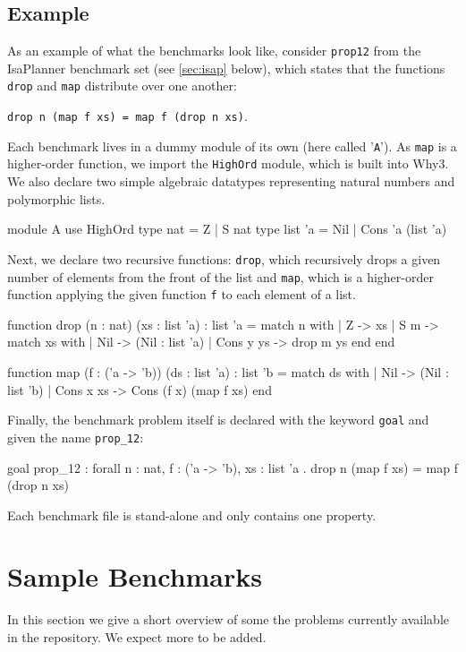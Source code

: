\documentclass{llncs}
\begin{document}
\subsection*{Example}
As an example of what the benchmarks look like, consider \texttt{prop12} from the IsaPlanner benchmark set (see \ref{sec:isap} below), which states that the functions \texttt{drop} and \texttt{map} distribute over one another: \begin{center} \texttt{drop n (map f xs) = map f (drop n xs)}.\end{center}
Each benchmark lives in a dummy module of its own (here called '\texttt{A}'). As \texttt{map} is a higher-order function, we import the \texttt{HighOrd} module, which is built into Why3. We also declare two simple algebraic datatypes representing natural numbers and polymorphic lists.

\begin{code}
module A
  use HighOrd
  type nat = Z | S nat
  type list 'a = Nil | Cons 'a (list 'a)
\end{code}

Next, we declare two recursive functions: \texttt{drop}, which recursively drops a given number of elements from the front of the list and \texttt{map}, which is a higher-order function applying the given function \texttt{f} to each element of a list.

\begin{code}
function drop (n : nat) (xs : list 'a) : list 'a =
match n with
	| Z -> xs
	| S m ->
		match xs with
		| Nil -> (Nil : list 'a)
		| Cons y ys -> drop m ys
	end
end

function map (f : ('a -> 'b)) (ds : list 'a) : list 'b =
match ds with
	| Nil -> (Nil : list 'b)
	| Cons x xs -> Cons (f x) (map f xs)
end
\end{code}

Finally, the benchmark problem itself is declared with the keyword \texttt{goal} and given the name \texttt{prop\_12}:

\begin{code}
goal prop_12 :
  forall n : nat, f : ('a -> 'b), xs : list 'a .
  drop n (map f xs) = map f (drop n xs)
\end{code}
Each benchmark file is stand-alone and only contains one property.

\section{Sample Benchmarks}
In this section we give a short overview of  some the problems currently available in the repository. We expect more to be added.
\end{document}
